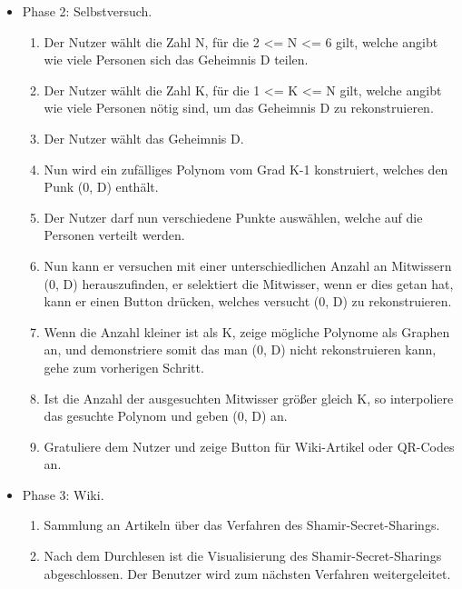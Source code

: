 \documentclass{article}
\begin{document}
\begin{itemize}[label={}]
 \item Phase 2: Selbstversuch.

	\begin{enumerate}
     \item Der Nutzer wählt die Zahl N,
        für die 2 <= N <= 6 gilt, welche
        angibt wie viele Personen sich das
        Geheimnis D teilen.
     \item Der Nutzer wählt die Zahl K,
        für die 1 <= K <= N gilt, welche
        angibt wie viele Personen nötig
        sind, um das Geheimnis D zu
        rekonstruieren.
     \item Der Nutzer wählt das Geheimnis D.
     \item Nun wird ein zufälliges Polynom
        vom Grad K-1 konstruiert, welches
        den Punk (0, D) enthält.
     \item Der Nutzer darf nun verschiedene
        Punkte auswählen, welche auf
        die Personen verteilt werden.
     \item Nun kann er versuchen mit
        einer unterschiedlichen Anzahl
        an Mitwissern (0, D)
        herauszufinden, er selektiert
        die Mitwisser, wenn er dies
        getan hat, kann er einen
        Button drücken, welches
        versucht (0, D) zu rekonstruieren.
     \item Wenn die Anzahl kleiner ist als
        K, zeige mögliche Polynome als
        Graphen an, und demonstriere somit
        das man (0, D) nicht rekonstruieren
        kann, gehe zum vorherigen Schritt.
     \item Ist die Anzahl der ausgesuchten
        Mitwisser größer gleich K, so
        interpoliere das gesuchte Polynom
        und geben (0, D) an.
     \item Gratuliere dem Nutzer und
        zeige Button für Wiki-Artikel
        oder QR-Codes an.
	\end{enumerate}

 \item Phase 3: Wiki.

	\begin{enumerate}
	 \item Sammlung an Artikeln über das Verfahren des Shamir-Secret-Sharings.
	 \item Nach dem Durchlesen ist die Visualisierung des Shamir-Secret-Sharings abgeschlossen. Der Benutzer wird zum nächsten Verfahren weitergeleitet.
 	\end{enumerate}

\end{itemize}
\end{document}

